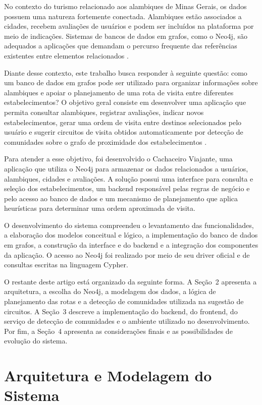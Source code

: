 \documentclass{jaes}
\begin{document}
No contexto do turismo relacionado aos alambiques de Minas Gerais, os dados possuem uma natureza fortemente conectada. Alambiques estão associados a cidades, recebem avaliações de usuários e podem ser incluídos na plataforma por meio de indicações. Sistemas de bancos de dados em grafos, como o Neo4j, são adequados a aplicações que demandam o percurso frequente das referências existentes entre elementos relacionados \cite{cattell2010scalable}.

Diante desse contexto, este trabalho busca responder à seguinte questão: como um banco de dados em grafos pode ser utilizado para organizar informações sobre alambiques e apoiar o planejamento de uma rota de visita entre diferentes estabelecimentos? O objetivo geral consiste em desenvolver uma aplicação que permita consultar alambiques, registrar avaliações, indicar novos estabelecimentos, gerar uma ordem de visita entre destinos selecionados pelo usuário e sugerir circuitos de visita obtidos automaticamente por detecção de comunidades sobre o grafo de proximidade dos estabelecimentos \cite{Santos2025}.

Para atender a esse objetivo, foi desenvolvido o Cachaceiro Viajante, uma aplicação que utiliza o Neo4j para armazenar os dados relacionados a usuários, alambiques, cidades e avaliações. A solução possui uma interface para consulta e seleção dos estabelecimentos, um backend responsável pelas regras de negócio e pelo acesso ao banco de dados e um mecanismo de planejamento que aplica heurísticas para determinar uma ordem aproximada de visita.

O desenvolvimento do sistema compreendeu o levantamento das funcionalidades, a elaboração dos modelos conceitual e lógico, a implementação do banco de dados em grafos, a construção da interface e do backend e a integração dos componentes da aplicação. O acesso ao Neo4j foi realizado por meio de seu driver oficial e de consultas escritas na linguagem Cypher.

O restante deste artigo está organizado da seguinte forma. A Seção~2 apresenta a arquitetura, a escolha do Neo4j, a modelagem dos dados, a lógica de planejamento das rotas e a detecção de comunidades utilizada na sugestão de circuitos. A Seção~3 descreve a implementação do backend, do frontend, do serviço de detecção de comunidades e o ambiente utilizado no desenvolvimento. Por fim, a Seção~4 apresenta as considerações finais e as possibilidades de evolução do sistema.

\section{Arquitetura e Modelagem do Sistema}
\end{document}
